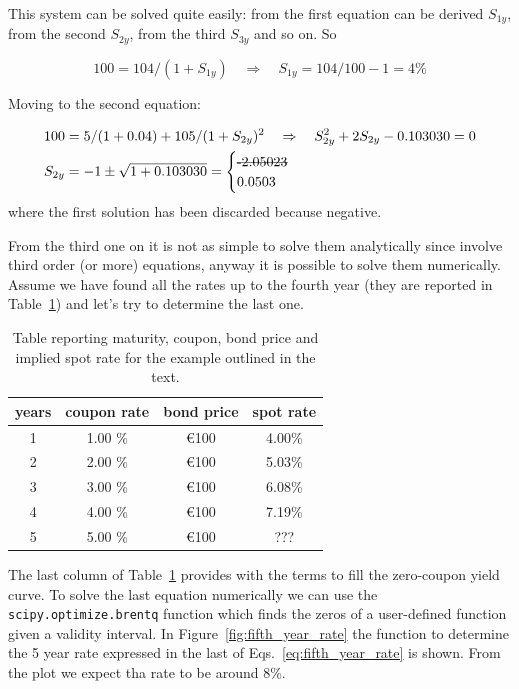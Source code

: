This system can be solved quite easily: from the first equation can be derived $S_{1y}$, from the second $S_{2y}$, from the third $S_{3y}$ and so on. So

\[100 = 104 / (1 + S_{1y})\quad\Rightarrow\quad S_{1y} = 104/100 - 1 = 4\% \]

Moving to the second equation:

\begin{equation*}
\begin{split}
& 100 = 5 / (1 + 0.04) + 105 / (1 + S_{2y})^{2}\quad\Rightarrow\quad S_{2y}^2  + 2 S_{2y}  - 0.103030 = 0 \\
& S_{2y} = - 1 \pm \sqrt{1 + 0.103030} = \begin{cases}\text{\sout{-2.05023}} \\ 0.0503\end{cases}
\end{split}
\end{equation*}
where the first solution has been discarded because negative.

From the third one on it is not as simple to solve them analytically since involve third order (or more) equations, anyway it is possible to solve them numerically.
Assume we have found all the rates up to the fourth year (they are reported in Table~\ref{tab:rates}) and let's try to determine the last one.

\begin{table}[htb]
\begin{center}
\begin{tabular}{|c|c|c|c|}
\hline
\textbf{years} & \textbf{coupon rate} & \textbf{bond price} & \textbf{spot rate} \\
\hline
1 & 1.00 \% & \euro{100} & 4.00\% \\
\hline
2 & 2.00 \% & \euro{100} & 5.03\% \\
\hline
3 & 3.00 \% & \euro{100} & 6.08\% \\
\hline
4 & 4.00 \% & \euro{100} & 7.19\% \\
\hline
5 & 5.00 \% & \euro{100} & ??? \\
\hline
\end{tabular}
\end{center}
\caption{Table reporting maturity, coupon, bond price and implied spot rate for the example outlined in the text.}
\label{tab:rates}
\end{table}
The last column of Table~\ref{tab:rates} provides with the terms to fill the zero-coupon yield curve.
To solve the last equation numerically we can use the \texttt{scipy.optimize.brentq} function which finds the zeros of a user-defined function given a validity interval.
In Figure~\ref{fig:fifth_year_rate} the function to determine the 5 year rate expressed in the last of Eqs.~\ref{eq:fifth_year_rate} is shown. From the plot we expect tha rate to be around 8\%.

